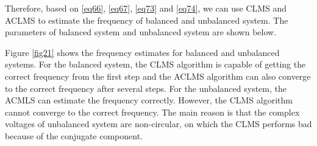 \documentclass[10pt]{article}
\begin{document}
Therefore, based on \eqref{eq66}, \eqref{eq67}, \eqref{eq73} and \eqref{eq74}, we can use CLMS and ACLMS
to estimate the frequency of balanced and unbalanced system. The parameters of balanced
system and unbalanced system are shown below. 

\begin{table}[htbp]
	\caption{Parameters of balanced and unbalanced systems}
	\centering
\end{table}

Figure \ref{fig21} shows the frequency estimates for balanced and unbalanced systems.
For the balanced system, the CLMS algorithm is capable of getting the correct frequency 
from the first step and the ACLMS algorithm can also converge to the correct frequency
after several steps. For the unbalanced system, the ACMLS can estimate the frequency correctly.
However, the CLMS algorithm cannot converge to the correct frequency. The main reason is that
the complex voltages of unbalanced system are non-circular, on which the CLMS performs bad 
because of the conjugate component. 
\end{document}

